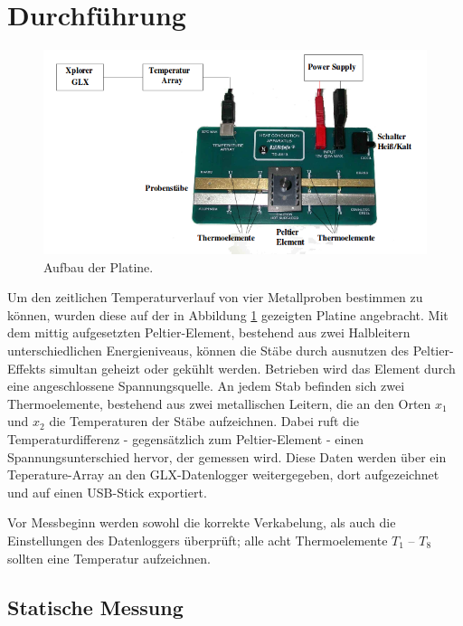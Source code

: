 \newpage
\section{Durchführung}
\label{sec:Durchfuehrung}
\begin{figure}
	\centering
	\includegraphics[width=\textwidth]{Bilder/Aufbau.png}
	\caption{Aufbau der Platine.}
\label{fig:platine}
\end{figure}

Um den zeitlichen Temperaturverlauf von vier Metallproben bestimmen zu können, wurden diese auf der in Abbildung \ref{fig:platine} gezeigten Platine angebracht. Mit dem mittig aufgesetzten Peltier-Element, bestehend aus zwei Halbleitern unterschiedlichen Energieniveaus, können die Stäbe durch ausnutzen des Peltier-Effekts simultan geheizt oder gekühlt werden. Betrieben wird das Element durch eine angeschlossene Spannungsquelle. 
An jedem Stab befinden sich zwei Thermoelemente, bestehend aus zwei metallischen Leitern, die an den Orten $x_1$ und $x_2$ die Temperaturen der Stäbe aufzeichnen. Dabei ruft die Temperaturdifferenz - gegensätzlich zum Peltier-Element - einen Spannungsunterschied hervor, der gemessen wird. Diese Daten werden über ein Teperature-Array an den GLX-Datenlogger weitergegeben, dort aufgezeichnet und auf einen USB-Stick exportiert. 

Vor Messbeginn werden sowohl die korrekte Verkabelung, als auch die Einstellungen des Datenloggers überprüft; alle acht Thermoelemente $T_\mathup{1}$ -- $T_\mathup{8}$ sollten eine Temperatur aufzeichnen.

\subsection{Statische Messung}

